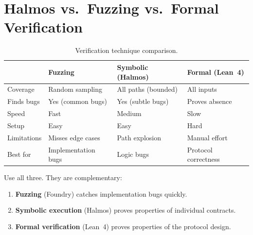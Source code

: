 \section{Halmos vs.\ Fuzzing vs.\ Formal Verification}


\begin{table}[H]
\centering
\small
\begin{tabular}{@{}llll@{}}
\toprule
 & \textbf{Fuzzing} & \textbf{Symbolic (Halmos)} & \textbf{Formal (Lean~4)} \\
\midrule
Coverage & Random sampling & All paths (bounded) & All inputs \\
Finds bugs & Yes (common bugs) & Yes (subtle bugs) & Proves absence \\
Speed & Fast & Medium & Slow \\
Setup & Easy & Easy & Hard \\
Limitations & Misses edge cases & Path explosion & Manual effort \\
Best for & Implementation bugs & Logic bugs & Protocol correctness \\
\bottomrule
\end{tabular}
\caption{Verification technique comparison.}
\end{table}

Use all three. They are complementary:
\begin{enumerate}[nosep]
  \item \textbf{Fuzzing} (Foundry) catches implementation bugs quickly.
  \item \textbf{Symbolic execution} (Halmos) proves properties of individual contracts.
  \item \textbf{Formal verification} (Lean~4) proves properties of the protocol design.
\end{enumerate}

